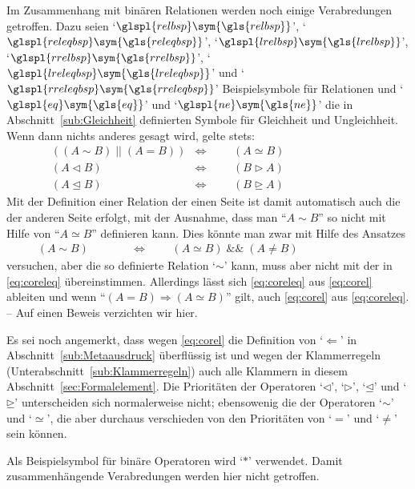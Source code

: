 \documentclass[english,ngerman,parskip=half,headsepline,footsepline,
	fleqn,notitlepage]{scrreprt}
\newcommand*{\metaund}{\&\&}%
\newcommand*{\metaoder}{||}%
\newcommand*{\metaand}{\;\metaund\;}%
\newcommand*{\metaor}{\;\metaoder\;}%
\newcommand*{\metaimp}{\Rightarrow}%
\newcommand*{\metarep}{\Leftarrow}%
\newcommand*{\metaequiv}{\Leftrightarrow}%
\newcommand*{\opbsp}{\ast}
\newcommand*{\relbsp}{\sim}
\newcommand*{\releqbsp}{\simeq}
\newcommand*{\lrelbsp}{\lhd}
\newcommand*{\rrelbsp}{\rhd}
\newcommand*{\lreleqbsp}{\unlhd}
\newcommand*{\rreleqbsp}{\unrhd}
\newcommand*{\formulatoleft}{&&&&&&&&&&}%
\newcommand*{\formulaspace}{&&&&}%
\newcommand*{\charqt}[1]{\enquote*{#1}}%
\newcommand*{\strqt}[1]{\enquote{#1}}%
\newcommand*{\symqt}[1]{\charqt{#1}}%
\newcommand*{\forqt}[1]{\strqt{#1}}%
\newcommand*{\sectionname}{Abschnitt}
\newcommand*{\subsectionname}{Unterabschnitt}
\newcommand*{\glsSym}[1]{\glspl{#1}\sym{\gls{#1}}}%
\begin{document}
	Im Zusammenhang mit binären Relationen werden noch einige Verabredungen
	getroffen.
	Dazu seien
	\symqt{$\glsSym{relbsp}$},       \symqt{$\glsSym{releqbsp}$},
	\symqt{$\glsSym{lrelbsp}$},      \symqt{$\glsSym{rrelbsp}$},
	\symqt{$\glsSym{lreleqbsp}$} und \symqt{$\glsSym{rreleqbsp}$}
	Beispielsymbole für Relationen und
	\symqt{$\glsSym{eq}$}        und \symqt{$\glsSym{ne}$} die in \sectionname~\vref{sub:Gleichheit}
	definierten Symbole für Gleichheit und Ungleichheit.
	Wenn dann nichts anderes gesagt wird,
	gelte stets:
	\begin{align}
		& ((A \relbsp   B) \metaor (A = B)) & \metaequiv &&& (A \releqbsp  B)
		\label{eq:coreleq}   \\
		& (A \lrelbsp   B)                  & \metaequiv &&& (B \rrelbsp   A)
		\label{eq:colrrel}   \\
		& (A \lreleqbsp B)                  & \metaequiv &&& (B \rreleqbsp A)
		\label{eq:colrreleq} \formulatoleft
	\end{align}
	Mit der Definition einer Relation der einen Seite
	ist damit automatisch auch die der anderen Seite erfolgt,
	mit der Ausnahme,
	dass man \forqt{$A \relbsp B$} so nicht mit Hilfe von \forqt{$A \releqbsp B$}
	definieren kann.
	Dies könnte man zwar mit Hilfe des Ansatzes
	\begin{align}
		& (A \relbsp B) &\formulaspace \metaequiv &&&
		(A \releqbsp B) \metaand (A \ne B) \label{eq:corel} \formulatoleft
	\end{align}
	versuchen,
	aber die so definierte Relation \symqt{$\relbsp$} kann,
	muss aber nicht mit der in \vref{eq:coreleq} übereinstimmen.
	Allerdings lässt sich \vref{eq:coreleq} aus \vref{eq:corel} ableiten
	und wenn \forqt{$(A = B) \metaimp (A \releqbsp B)$} gilt,
	auch \vref{eq:corel} aus \vref{eq:coreleq}.
	-- Auf einen Beweis verzichten wir hier.

	Es sei noch angemerkt, dass wegen \vref{eq:corel}
	die Definition von \symqt{$\metarep$} in \sectionname~\vref{sub:Metaausdruck}
	überflüssig ist
	und wegen der Klammerregeln
	(\seename \subsectionname~\vref{sub:Klammerregeln})
	auch alle Klammern in diesem \sectionname~\ref{sec:Formalelement}.
	Die Prioritäten der Operatoren \symqt{$\lrelbsp$}, \symqt{$\rrelbsp$},
	\symqt{$\lreleqbsp$} und \symqt{$\rreleqbsp$}
	unterscheiden sich normalerweise nicht;
	ebensowenig die der Operatoren \symqt{$\relbsp$} und \symqt{$\releqbsp$},
	die aber durchaus verschieden von den Prioritäten
	von \symqt{$=$} und \symqt{$\ne$} sein können.

	Als Beispielsymbol für binäre Operatoren wird \symqt{$\opbsp$} verwendet.
	Damit zusammenhängende Verabredungen werden hier nicht getroffen.
\end{document}
